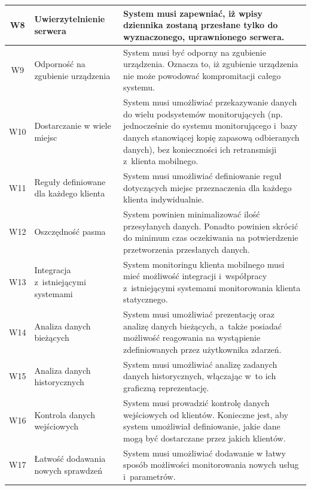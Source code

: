\begin{longtable}[c]{|c||p{3.5cm}|p{9cm}|}
  W8 & \raggedright{Uwierzytelnienie serwera} & \raggedright{System musi zapewniać, iż wpisy dziennika zostaną przesłane tylko do wyznaczonego, uprawnionego serwera.} \tabularnewline
  \hline

  W9 & \raggedright{Odporność na zgubienie urządzenia} & \raggedright{System musi być odporny na zgubienie urządzenia. Oznacza to, iż zgubienie urządzenia nie może powodować kompromitacji całego systemu.} \tabularnewline
  \hline

  W10 & \raggedright{Dostarczanie w wiele miejsc} &
  \raggedright{System musi umożliwiać przekazywanie danych do wielu
    podsystemów monitorujących (np. jednocześnie do systemu
    monitorującego i~bazy danych stanowiącej kopię zapasową
    odbieranych danych), bez konieczności ich retransmisji z~klienta
    mobilnego.} \tabularnewline \hline

  W11 & \raggedright{Reguły definiowane dla każdego klienta} & \raggedright{System musi umożliwiać definiowanie reguł dotyczących miejsc przeznaczenia dla każdego klienta indywidualnie.} \tabularnewline
  \hline

  W12 & \raggedright{Oszczędność pasma} & \raggedright{System powinien minimalizować ilość przesyłanych danych. Ponadto powinien skrócić do minimum czas oczekiwania na potwierdzenie przetworzenia przesłanych danych.} \tabularnewline
  \hline

  W13 & \raggedright{Integracja z~istniejącymi systemami} & \raggedright{System monitoringu klienta mobilnego musi mieć możliwość integracji i~współpracy z~istniejącymi systemami monitorowania klienta statycznego.} \tabularnewline
  \hline

  W14 & \raggedright{Analiza danych bieżących} & \raggedright{System musi umożliwiać prezentację oraz analizę danych bieżących, a~także posiadać możliwość reagowania na wystąpienie zdefiniowanych przez użytkownika zdarzeń.} \tabularnewline
  \hline

  W15 & \raggedright{Analiza danych historycznych} & \raggedright{System musi umożliwiać analizę zadanych danych historycznych, włączając w~to ich graficzną reprezentację.} \tabularnewline
  \hline

  W16 & \raggedright{Kontrola danych wejściowych} & \raggedright{System musi prowadzić kontrolę danych wejściowych od klientów. Konieczne jest, aby system umożliwiał definiowanie, jakie dane mogą być dostarczane przez jakich klientów.} \tabularnewline
  \hline

  W17 & \raggedright{Łatwość dodawania nowych sprawdzeń} & \raggedright{System musi umożliwiać dodawanie w łatwy sposób możliwości monitorowania nowych usług i~parametrów.} \tabularnewline
  \hline


\end{longtable}
